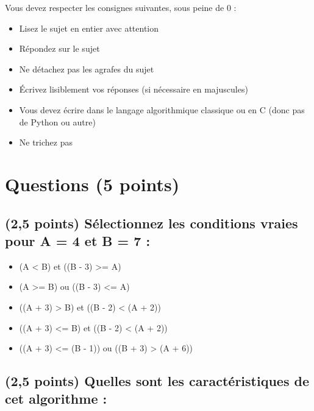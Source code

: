 \documentclass[11pt,a4paper]{article}
\begin{document}
\MakeExamTitle                   %


\bigskip

Vous devez respecter les consignes suivantes, sous peine de 0 :

\begin{itemize}
\item Lisez le sujet en entier avec attention
\item Répondez sur le sujet
\item Ne détachez pas les agrafes du sujet
\item \'Ecrivez lisiblement vos réponses (si nécessaire en majuscules)
\item Vous devez écrire dans le langage algorithmique classique ou en C (donc pas de Python ou autre)
\item Ne trichez pas
\end{itemize}


\vfillFirst

\section{Questions (5 points)}

\subsection{(2,5 points) Sélectionnez les conditions vraies pour A = 4 et B = 7 : }

\bigskip

\begin{itemize}
  \item[\CaseCoche] (A < B) et ((B - 3) >= A) %
  \item[\CaseCoche] (A >= B) ou ((B - 3) <= A) %
  \item[\CaseCoche] ((A + 3) > B) et ((B - 2) < (A + 2)) %
  \item[\CaseCoche] ((A + 3) <= B) et ((B - 2) < (A + 2)) %
  \item[\CaseCoche] ((A + 3) <= (B - 1)) ou ((B + 3) > (A + 6)) %
\end{itemize}




\subsection{(2,5 points) Quelles sont les caractéristiques de cet algorithme : }
\end{document}
